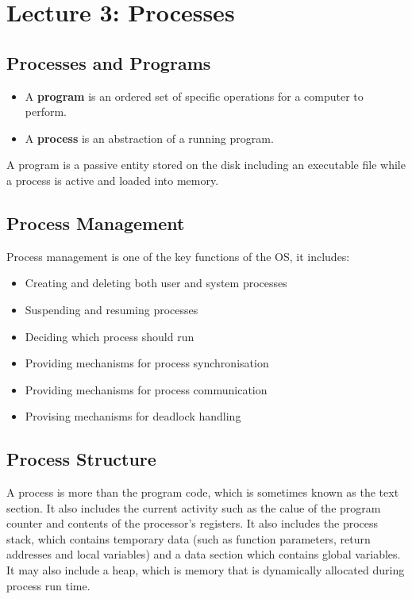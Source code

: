 \documentclass{article}%
\begin{document}
\maketitle
\section{Lecture 3: Processes}
\subsection{Processes and Programs}

\begin{itemize}
	\item A \textbf{program} is an ordered set of specific operations for a computer to perform.
	\item A \textbf{process} is an abstraction of a running program.
\end{itemize}
A program is a passive entity stored on the disk including an executable file while a process is active and loaded into memory.

\subsection{Process Management}
Process management is one of the key functions of the OS, it includes:
\begin{itemize}
	\item Creating and deleting both user and system processes
	\item Suspending and resuming processes
	\item Deciding which process should run
	\item Providing mechanisms for process synchronisation
	\item Providing mechanisms for process communication
	\item Provising mechanisms for deadlock handling
\end{itemize}

\subsection{Process Structure}
A process is more than the program code, which is sometimes known as the text section.
It also includes the current activity such as the calue of the program counter and contents of the processor's registers.
It also includes the process stack, which contains temporary data (such as function parameters, return addresses and local variables) and a data section which contains global variables.
It may also include a heap, which is memory that is dynamically allocated during process run time.
\end{document}
